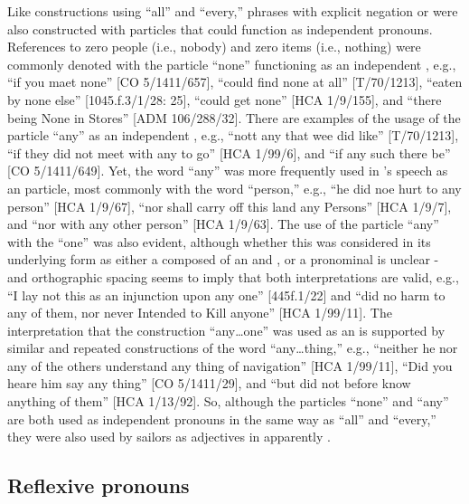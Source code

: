Like constructions using “all” and “every,” phrases with explicit negation or  were also constructed with  particles that could function as independent pronouns. References to zero people (i.e., nobody) and zero items (i.e., nothing) were commonly denoted with the particle “none” functioning as an independent , e.g., “if you maet none” [CO 5/1411/657], “could find none at all” [T/70/1213], “eaten by none else” [1045.f.3/1/28: 25], “could get none” [HCA 1/9/155], and “there being None in Stores” [ADM 106/288/32]. There are examples of the usage of the particle “any” as an independent , e.g., “nott any that wee did like” [T/70/1213], “if they did not meet with any to go” [HCA 1/99/6], and “if any such there be” [CO 5/1411/649]. Yet, the word “any” was more frequently used in ’s speech as an  particle, most commonly with the word “person,” e.g., “he did noe hurt to any person” [HCA 1/9/67], “nor shall carry off this land any Persons” [HCA 1/9/7], and “nor with any other person” [HCA 1/9/63]. The use of the particle “any” with the  “one” was also evident, although whether this was considered in its underlying form as either a  composed of an  and , or a pronominal  is unclear - and orthographic spacing seems to imply that both interpretations are valid, e.g., “I lay not this as an injunction upon any one” [445f.1/22] and “did no harm to any of them, nor never Intended to Kill anyone” [HCA 1/99/11]. The interpretation that the construction “any…one” was used as an   is supported by similar and repeated constructions of the word “any…thing,” e.g., “neither he nor any of the others understand any thing of navigation” [HCA 1/99/11], “Did you heare him say any thing” [CO 5/1411/29], and “but did not before know anything of them” [HCA 1/13/92]. So, although the particles “none” and “any” are both used as independent pronouns in the same way as “all” and “every,” they were also used by sailors as  adjectives in apparently .

\subsection{{Reflexive pronouns}}\label{sec:5.4.5}

